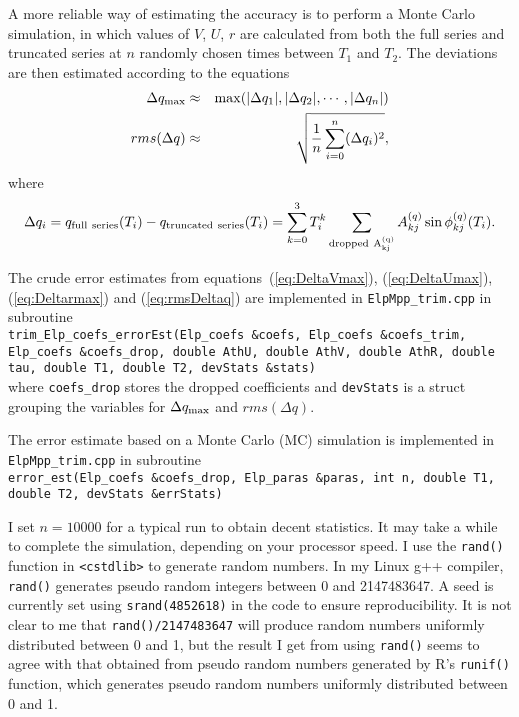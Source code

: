 \documentclass[12pt]{article}
\newcommand \beq {\begin{equation}}
\newcommand \eeq {\end{equation}}
\newcommand \beqn {\begin{eqnarray}}
\newcommand \eeqn {\end{eqnarray}}
\begin{document}
A more reliable way of estimating the accuracy is to perform a Monte Carlo simulation, 
in which values of $V$, $U$, $r$ are calculated from both the full series and truncated 
series at $n$ randomly chosen times between $T_1$ and $T_2$. The deviations 
are then estimated according to the equations 
\beqn
  \Delta q_{\rm max} &\approx& {\rm max}(|\Delta q_1|, |\Delta q_2|, \cdots, |\Delta q_n|) 
\label{eq:DeltaqmaxMC} \\
  rms(\Delta q) &\approx & \sqrt{ \frac{1}{n}\sum_{i=0}^n (\Delta q_i)^2 } ,
\label{DeltaqrmsMC}
\eeqn
where 
\beq
  \Delta q_i = q_{\rm full~series}(T_i) - q_{\rm truncated~series}(T_i) 
= \sum_{k=0}^3 T_i^k \sum_{\rm dropped~{A_{kj}^{(q)}}} A_{kj}^{(q)} 
\sin \phi_{kj}^{(q)}(T_i) .
\eeq

The crude error estimates from equations~(\ref{eq:DeltaVmax}),
(\ref{eq:DeltaUmax}), (\ref{eq:Deltarmax}) and (\ref{eq:rmsDeltaq}) are implemented 
in {\tt ElpMpp\_trim.cpp} in subroutine \\
{\tt trim\_Elp\_coefs\_errorEst(Elp\_coefs \&coefs, Elp\_coefs \&coefs\_trim, Elp\_coefs \&coefs\_drop,
                    double AthU, double AthV, double AthR, double tau,
                    double T1, double T2, devStats \&stats)} \\
where {\tt coefs\_drop} stores the dropped coefficients and 
{\tt devStats} is a struct grouping the variables for $\Delta q_{\rm max}$ 
and $rms(\Delta q)$. 

The error estimate based on a Monte Carlo (MC) simulation is implemented in 
{\tt ElpMpp\_trim.cpp} in subroutine \\
{\tt error\_est(Elp\_coefs \&coefs\_drop, Elp\_paras \&paras,
               int n, double T1, double T2, devStats \&errStats)} 

I set $n=10000$ for a typical run to obtain decent statistics. It may 
take a while to complete the simulation, depending on your processor speed. 
I use the {\tt rand()} function in {\tt <cstdlib>} to generate random numbers.
In my Linux g++ compiler, {\tt rand()} generates pseudo random integers between 
0 and 2147483647.
A seed is currently set using {\tt srand(4852618)} in the code to ensure reproducibility. 
It is not clear to me that {\tt rand()/2147483647} will produce random 
numbers uniformly distributed between 0 and 1, but the result I get from 
using {\tt rand()} seems to agree with that 
obtained from pseudo random numbers generated by R's {\tt runif()} function, which 
generates pseudo random numbers uniformly distributed between 0 and 1.
\end{document}
